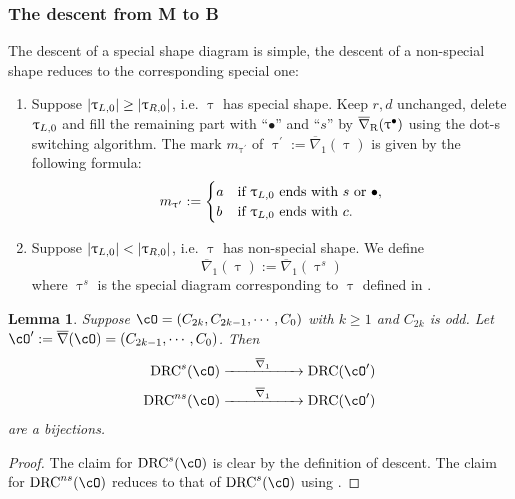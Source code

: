 \documentclass[12pt,a4paper]{amsart}
\def\abs#1{\left|{#1}\right|}
\def\eDD{\overline{\nabla}}
\def\eDDo{\overline{\nabla}_1}
\numberwithin{equation}{section}
\newtheorem{lem}[thm]{Lemma}
\theoremstyle{remark}
\def\drc{\mathrm{DRC}}
\def\drcs{\mathrm{DRC}^{s}}
\def\drcns{\mathrm{DRC}^{ns}}
\def\cOp{\cO^{\prime}}
\def\uptaup{\uptau^{\prime}}
\begin{document}
\subsubsection{The descent from M to B}
The descent of a special shape diagram is simple, the descent of a non-special shape
reduces to the corresponding special one:
\begin{enumerate}[resume*=alg2]
  \item Suppose $\abs{\taulf} \geq \abs{\taurf} $, i.e. $\uptau$ has special
        shape. Keep $r,d$ unchanged, delete $\uptau_{L,0}$ and fill the remaining part
        with ``$\bullet$'' and ``$s$'' by $\DDr(\uptau^{\bullet})$ using the
        dot-s switching algorithm. The mark $m_{\uptaup}$ of
        $\uptaup:=\eDDo(\uptau)$ is given by the following formula:
        \[
        m_{\uptaup}:= \begin{cases}
          a & \text{if  $\taulf$ ends with $s$ or $\bullet$},\\
          b & \text{if $\taulf$ ends with $c$}.
        \end{cases}
        \]

  \item Suppose $\abs{\taulf} < \abs{\taurf}$, i.e. $\uptau$ has non-special
        shape. We define
        \[\eDDo(\uptau):=\eDDo(\uptau^{s})\]
        where $\uptau^{s}$ is the special diagram corresponding to $\uptau$
        defined in .
\end{enumerate}

\begin{lem}\label{lem:ds.BM}
  Suppose $\cO = (C_{2k},C_{2k-1}, \cdots, C_{0})$ with $k\geq 1$ and $C_{2k}$
  is odd.
  Let $\cOp := \eDD(\cO)=(C_{2k-1},\cdots, C_{0})$.
  Then
  \[
    \begin{split}
      \drcs(\cO) &\xrightarrow{\hspace{2em}\eDDo\hspace{2em}} \drc(\cOp) \\
      \drcns(\cO)&
      \xrightarrow{\hspace{2em}\eDDo\hspace{2em}} \drc(\cOp)
    \end{split}
  \]
  are a bijections.
\end{lem}
\begin{proof}
  The claim for $\drcs(\cO)$ is clear by the definition of descent.
  The claim for $\drcns(\cO)$ reduces to that of $\drcs(\cO)$ using .
\end{proof}
\end{document}
